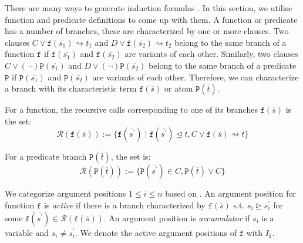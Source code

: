 
There are many ways to generate induction formulas \cite{aclhandbook,bundychapter,cruanes,hipspec,hipster,isaplanner,computing}. In this section, we utilise function and predicate definitions to come up with them. A function or predicate has a number of branches, these are characterized by one or more clauses.  Two clauses $C\lor \mathtt{f}(\overline{s_1})\rightsquigarrow t_1$ and $D\lor \mathtt{f}(\overline{s_2})\rightsquigarrow t_2$ belong to the same branch of a function $\mathtt{f}$ if $\mathtt{f}(\overline{s_1})$ and $\mathtt{f}(\overline{s_2})$ are variants of each other. Similarly, two clauses $C\lor (\neg)\mathtt{P}(\overline{s_1})$ and $D\lor (\neg)\mathtt{P}(\overline{s_2})$ belong to the same branch of a predicate $\mathtt{P}$ if $\mathtt{P}(\overline{s_1})$ and $\mathtt{P}(\overline{s_2})$ are variants of each other. Therefore, we can characterize a branch with its characteristic term $\mathtt{f}(\overline{s})$ or atom $\mathtt{P}(\overline{t})$.

For a function, the recursive calls corresponding to one of its branches $\mathtt{f}(\overline{s})$ is the set:
$$\mathcal{R}(\mathtt{f}(\overline{s})):=\{\mathtt{f}(\overline{s^\prime})\mid \mathtt{f}(\overline{s^\prime})\trianglelefteq t, C\lor \mathtt{f}(\overline{s}) \rightsquigarrow t\}$$

For a predicate branch $\mathtt{P}(\overline{t})$, the set is:
$$\mathcal{R}(\mathtt{P}(\overline{t})):=\{\mathtt{P}(\overline{s^\prime})\in C, \mathtt{P}(\overline{t})
\lor C\}$$


We categorize argument positions $1\le i\le n$ based on \cite{cruanes}. An argument position for function $\mathtt{f}$ is \textit{active} if there is a branch characterized by $\mathtt{f}(\overline{s})$ s.t. $s_i \trianglerighteq s^\prime_i$ for some $\mathtt{f}(\overline{s^\prime})\in\mathcal{R}(\mathtt{f}(\overline{s}))$. An argument position is \textit{accumulator} if $s_i$ is a variable and $s_i\neq s^\prime_i$. We denote the active argument positions of $\mathtt{f}$ with $I_\mathtt{f}$.

